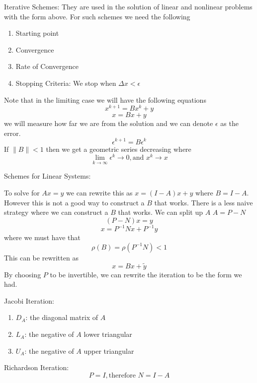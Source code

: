 \begin{remark}
    Iterative Schemes:
    They are used in the solution of linear and nonlinear problems with the form above. For such schemes 
    we need the following 
    \begin{enumerate}
        \item Starting point
        \item Convergence 
        \item Rate of Convergence
        \item Stopping Criteria: We stop when \(\Delta x < \epsilon \) 
    \end{enumerate}
    Note that in the limiting case we will have the following equations 
    \[
        x^{k+1}  = B x^k +y
    \]
    \[
        x = Bx +y
    \]
    we will measure how far we are from the solution and we can denote \(\epsilon \)  as the error. 
    \[
        \epsilon^{k+1} = B \epsilon^k
    \]
    If \(\lVert B \rVert < 1 \) then we get a geometric series decreasing where 
    \[
        \lim_{k \to \infty} \epsilon^k \to 0, \text{and } x^k \to  x
    \]
\end{remark}
\begin{remark}
    Schemes for Linear Systems: 

    To solve for \(Ax=y\) we can rewrite this as \(x = (I-A) x +y\) where \(B = I-A\). 
    However this is not a good way to construct a \(B\) that works. There is a less naive strategy where we can 
    construct a \(B\)  that works. We can split up \(A\) 
    \( A= P-N\) 
    \[
        (P-N)x = y
    \]
    \[
        x = P^{-1}Nx + P^{-1}y
    \]
    where we must have that 
    \[
        \rho (B) = \rho (P^{-1}N) < 1
    \]
    This can be rewritten as 
    \[
        x = Bx + \widetilde{y} 
    \]
    By choosing \(P\) to be invertible, we can rewrite the iteration to be the form we had. 
\end{remark}

\begin{definition}
    Jacobi Iteration:
    \begin{enumerate}
        \item \(D_A\): the diagonal matrix of \(A\) 
        \item \(L_A\): the negative of \(A\) lower triangular
        \item \(U_A\): the negative of \(A\) upper triangular
    \end{enumerate}
\end{definition}

\begin{definition}
    Richardson Iteration: 
    \[
        P = I, \text{therefore } N= I-A
    \]
\end{definition}